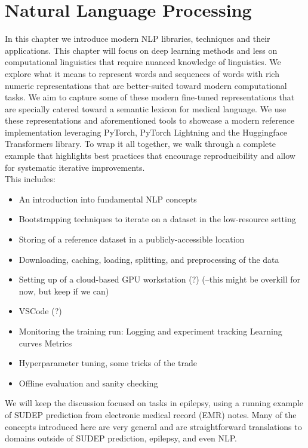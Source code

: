 
\chapter{Natural Language Processing}

In this chapter we introduce modern NLP libraries, techniques and their applications.
This chapter will focus on deep learning methods and less on computational linguistics that require nuanced knowledge of linguistics.
We explore what it means to represent words and sequences of words with rich numeric representations that are better-suited toward modern computational tasks.
We aim to capture some of these modern fine-tuned representations that are specially catered toward a semantic lexicon for medical language.
We use these representations and aforementioned tools to showcase a modern reference implementation leveraging PyTorch, PyTorch Lightning and the Huggingface Transformers library.
To wrap it all together, we walk through a complete example that highlights best practices that encourage reproducibility and allow for systematic iterative improvements.
\\

\noindent This includes:
\begin{itemize}
\item An introduction into fundamental NLP concepts
\item Bootstrapping techniques to iterate on a dataset in the low-resource setting
\item Storing of a reference dataset in a publicly-accessible location
\item Downloading, caching, loading, splitting, and preprocessing of the data
\item Setting up of a cloud-based GPU workstation (?) (--this might be overkill for now, but keep if we can)
\item VSCode (?)
\item Monitoring the training run:
  \subitem Logging and experiment tracking
  \subitem Learning curves
  \subitem Metrics
\item Hyperparameter tuning, some tricks of the trade
\item Offline evaluation and sanity checking
\end{itemize}
We will keep the discussion focused on tasks in epilepsy, using a running example of SUDEP prediction from electronic medical record (EMR) notes.
Many of the concepts introduced here are very general and are straightforward translations to domains outside of SUDEP prediction, epilepsy, and even NLP.

